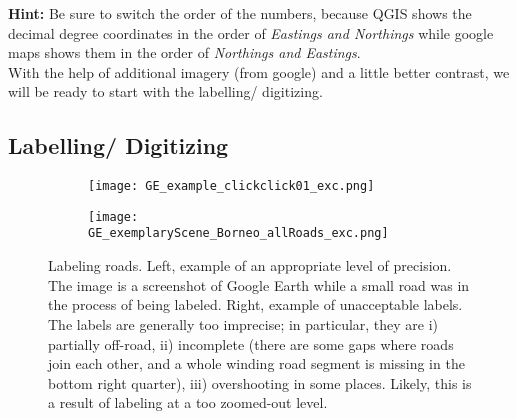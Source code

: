 \documentclass[12pt,a4paper]{scrartcl}
\begin{document}
\textbf{Hint:} Be sure to switch the order of the numbers, because QGIS shows the decimal degree coordinates in the order of \textit{Eastings and Northings} while google maps shows them in the order of \textit{Northings and Eastings}. \\

With the help of additional imagery (from google) and a little better contrast, we will be ready to start with the labelling/ digitizing.

\subsection{Labelling/ Digitizing}
\noindent{}
\bigskip

\begin{figure}
	\begin{subfigure}{0.48\textwidth}
		\texttt{[image: GE\_example\_clickclick01\_exc.png]}
		\label{fig:goodlabel}
	\end{subfigure} 
	\begin{subfigure}{0.48\textwidth}
		\texttt{[image: GE\_exemplaryScene\_Borneo\_allRoads\_exc.png]}
		\label{fig:badlabel}
	\end{subfigure} 
	\caption{Labeling roads. Left, example of an appropriate level of precision. The image is a screenshot of Google Earth while a small road was in the process of being labeled. Right, example of unacceptable labels. The labels are generally too imprecise; in particular, they are i) partially off-road, ii) incomplete (there are some gaps where roads join each other, and a whole winding road segment is missing in the bottom right quarter), iii) overshooting in some places. Likely, this is a result of labeling at a too zoomed-out level.}
	\label{fig:label_examples}
\end{figure}
\end{document}

